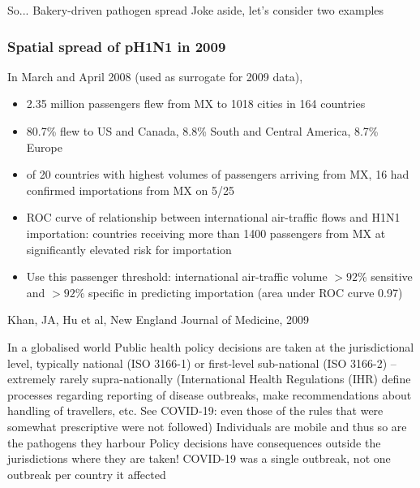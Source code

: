 \documentclass[aspectratio=169]{beamer}\usepackage[]{graphicx}\usepackage[]{xcolor}
\begin{document}
\begin{frame}{So...}
\bbullet Bakery-driven pathogen spread
\vfill
\bbullet Joke aside, let's consider two examples
\end{frame}


\begin{frame}
\frametitle{Spatial spread of pH1N1 in 2009}
	In March and April 2008 (used as surrogate for 2009 data), 
	\begin{itemize}
		\item 2.35 million passengers flew from MX to 1018 cities in 164 countries
		\item 80.7\% flew to US and Canada, 8.8\% South and Central America, 8.7\% Europe
		\item of 20 countries with highest volumes of passengers arriving from MX, 16 had confirmed importations from MX on 5/25
		\item ROC curve of relationship between international air-traffic flows
		and H1N1 importation: countries receiving more than 1400 passengers from MX at significantly elevated risk for importation
		\item Use this passenger threshold: international air-traffic volume 
		$>92\%$ sensitive and $>92\%$ specific in predicting importation (area under ROC curve 0.97)
	\end{itemize}
	\vfill
	\begin{flushright}
		Khan, JA, Hu et al, New England Journal of Medicine, 2009
	\end{flushright}
\end{frame}


\begin{frame}{In a globalised world}
\bbullet
Public health policy decisions are taken at the jurisdictional level, typically national (ISO 3166-1) or first-level sub-national (ISO 3166-2) -- extremely rarely supra-nationally
\vfill
(International Health Regulations (IHR) define processes regarding reporting of disease outbreaks, make recommendations about handling of travellers, etc. See COVID-19: even those of the rules that were somewhat prescriptive were not followed)
\vfill
\bbullet
Individuals are mobile and thus so are the pathogens they harbour
\vfill
\bbullet 
Policy decisions have consequences outside the jurisdictions where they are taken!
\vfill
\bbullet
COVID-19 was a single outbreak, not one outbreak per country it affected
\end{frame}
\end{document}
